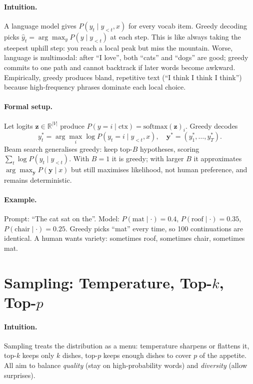 \paragraph{Intuition.} A language model gives $P(y_t \mid y_{<t}, x)$ for every vocab item. Greedy decoding picks $\hat{y}_t = \arg\max_y P(y\mid y_{<t})$ at each step. This is like always taking the steepest uphill step: you reach a local peak but miss the mountain. Worse, language is multimodal: after ``I love'', both ``cats'' and ``dogs'' are good; greedy commits to one path and cannot backtrack if later words become awkward. Empirically, greedy produces bland, repetitive text (``I think I think I think'') because high-frequency phrases dominate each local choice.

\paragraph{Formal setup.} Let logits $\mathbf{z}\in\mathbb{R}^{|V|}$ produce $P(y=i\mid \text{ctx})=\text{softmax}(\mathbf{z})_i$. Greedy decodes
\begin{equation}
y_t^* = \arg\max_{i} \log P(y_t=i\mid y_{<t}, x), \quad \mathbf{y}^*=(y_1^*,\dots,y_T^*).
\end{equation}
Beam search generalises greedy: keep top-$B$ hypotheses, scoring $\sum_{t}\log P(y_t\mid y_{<t})$. With $B=1$ it is greedy; with larger $B$ it approximates $\arg\max_{\mathbf{y}}P(\mathbf{y}\mid x)$ but still maximises likelihood, not human preference, and remains deterministic.

\paragraph{Example.} Prompt: ``The cat sat on the''. Model: $P(\text{mat}\mid\cdot)=0.4$, $P(\text{roof}\mid\cdot)=0.35$, $P(\text{chair}\mid\cdot)=0.25$. Greedy picks ``mat'' every time, so 100 continuations are identical. A human wants variety: sometimes roof, sometimes chair, sometimes mat.

\section{\texorpdfstring{Sampling: Temperature, Top-$k$, Top-$p$}{Sampling: Temperature, Top-k, Top-p}}
\label{sec:sampling}
\paragraph{Intuition.} Sampling treats the distribution as a menu: temperature sharpens or flattens it, top-$k$ keeps only $k$ dishes, top-$p$ keeps enough dishes to cover $p$ of the appetite. All aim to balance \emph{quality} (stay on high-probability words) and \emph{diversity} (allow surprises).

